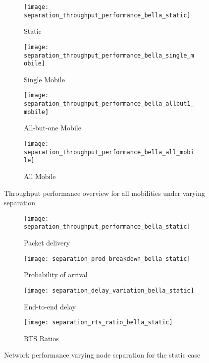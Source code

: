 \begin{figure}[h]
	\begin{subfigure}[t]{0.5\textwidth}
		\centering
		\texttt{[image: separation\_throughput\_performance\_bella\_static]}
		\caption{Static}
		\label{fig:separation_throughput_performance_sum_bella_static}
	\end{subfigure}
	\begin{subfigure}[t]{0.5\textwidth}
		\centering
		\texttt{[image: separation\_throughput\_performance\_bella\_single\_mobile]}
		\caption{Single Mobile}
		\label{fig:separation_throughput_performance_sum_bella_single_mobile}
	\end{subfigure}
	
	\begin{subfigure}[t]{0.5\textwidth}
		\centering
		\texttt{[image: separation\_throughput\_performance\_bella\_allbut1\_mobile]}
		\caption{All-but-one Mobile}
		\label{fig:separation_throughput_performance_sum_bella_allbut1_mobile}
	\end{subfigure}  
	\begin{subfigure}[t]{0.5\textwidth}
		\centering
		\texttt{[image: separation\_throughput\_performance\_bella\_all\_mobile]}
		\caption{All Mobile}
		\label{fig:separation_throughput_performance_sum_bella_all_mobile}
	\end{subfigure}  
	\caption{Throughput performance overview for all mobilities under varying separation}
	\label{fig:separation_all}
\end{figure}

\begin{figure}[tp!]
	\begin{subfigure}[t]{0.5\textwidth}
		\centering
		\texttt{[image: separation\_throughput\_performance\_bella\_static]}
		\caption{Packet delivery}
		\label{fig:separation_throughput_performance_bella_static}
	\end{subfigure}
	\begin{subfigure}[t]{0.5\textwidth}
		\centering
		\texttt{[image: separation\_prod\_breakdown\_bella\_static]}
		\caption{Probability of arrival}
		\label{fig:separation_prod_breakdown_bella_static}
	\end{subfigure}
	
	\begin{subfigure}[t]{0.5\textwidth}
		\centering
		\texttt{[image: separation\_delay\_variation\_bella\_static]}
		\caption{End-to-end delay}
		\label{fig:separation_delay_variation_bella_static}
	\end{subfigure}
	\begin{subfigure}[t]{0.5\textwidth}
		\centering
		\texttt{[image: separation\_rts\_ratio\_bella\_static]}
		\caption{RTS Ratios}
		\label{fig:separation_rts_ratio_bella_static}
	\end{subfigure}
	\caption{Network performance varying node separation for the static case}
	\label{fig:separation_bella_static}
\end{figure}


